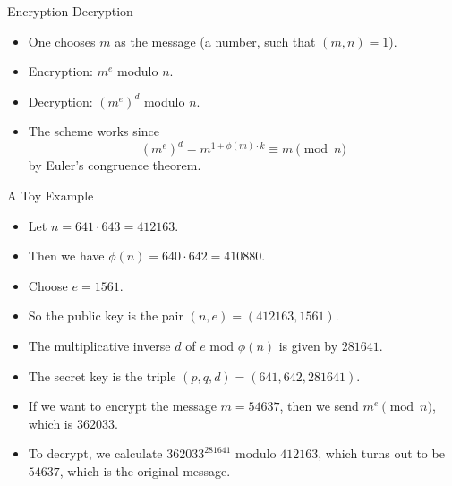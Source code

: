 \documentclass[ %
 usenames,dvipsnames,
aspectratio=169,11pt ]{beamer}
\newenvironment{stepitemize}{\begin{itemize}[<+->]}{\end{itemize} }
\begin{document}
\begin{frame}{Encryption-Decryption}
\begin{stepitemize}
    \item  One chooses $m$ as the message (a number, such that $(m,n)=1$).
    \item Encryption: $m^e$ modulo $n$.
    \item Decryption: $(m^e)^d$ modulo $n$.
    \item The scheme works since
$$(m^e)^d = m^{1+\phi(m)\cdot k} \equiv m \pmod{n}$$
by Euler's congruence theorem.

\end{stepitemize}

\end{frame}

\begin{frame}{A Toy Example}
\begin{stepitemize}
\item Let $n=641\cdot643 = 412163$.
\item Then we have $\phi(n)=640\cdot 642 = 410880$.
\item Choose $e=1561$.
\item So the public key is the pair $(n,e) = (412163,1561)$.
\item The multiplicative inverse $d$ of $e$ mod $\phi(n)$ is given by $281641$.
\item The secret key is the triple $(p,q,d) = (641, 642,281641)$.
\item If we want to encrypt the message $m=54637$, then we send $m^e \pmod{n}$, which is $362033$.
\item To decrypt, we calculate $362033^{281641}$ modulo $412163$, which turns out to be $54637$, which is the original message.
\end{stepitemize}
\end{frame}
\end{document}
